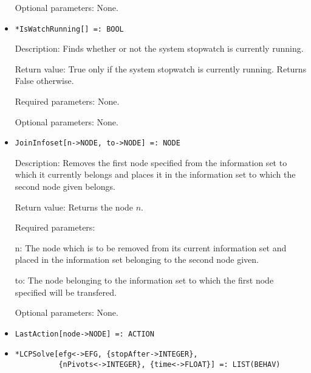 \begin{itemize}
\item
[Optional parameters:] None.
\ed

\item
\protect \large \begin{verbatim}
*IsWatchRunning[] =: BOOL
\end{verbatim}\normalsize

\bd
\item
[Description:] Finds whether or not the system stopwatch is currently
running.
\item
[Return value:] True only if the system stopwatch is currently
running.  Returns False otherwise.
\item
[Required parameters:] None.
\item
[Optional parameters:] None.
\ed


\item
\protect \large \begin{verbatim}
JoinInfoset[n->NODE, to->NODE] =: NODE
\end{verbatim}\normalsize

\bd
\item
[Description:] Removes the first node specified from the information
set to which it currently belongs and places it in the information set
to which the second node given belongs.
\item
[Return value:] Returns the node $n$.
\item
[Required parameters:]\hfil\null
	  
\bd
\item
[n:] The node which is to be removed from its current information set
and placed in the information set belonging to the second node given.
\item
[to:] The node belonging to the information set to which the first
node specified will be transfered.
\ed

\item
[Optional parameters:] None.
\ed



\item
\protect \large \begin{verbatim} 
LastAction[node->NODE] =: ACTION
\end{verbatim}\normalsize

\item
\protect \large \begin{verbatim}
*LCPSolve[efg<->EFG, {stopAfter->INTEGER},
          {nPivots<->INTEGER}, {time<->FLOAT}] =: LIST(BEHAV)
\end{verbatim}\normalsize


\end{itemize}
